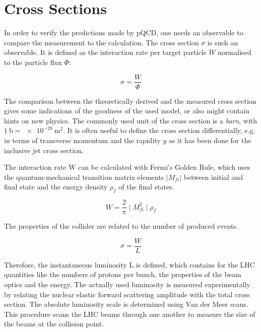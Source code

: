 \section{Cross Sections}

In order to verify the predictions made by pQCD, one needs an observable to compare the measurement to the calculation. The cross section $\sigma$ is such an observable. It is defined as the interaction rate per target particle $W$ normalised to the particle flux $\Phi$:

\begin{equation}
\sigma = \frac{W}{\Phi}
\end{equation}

The comparison between the theoretically derived and the measured cross section gives some indications of the goodness of the used model, or also might contain hints on new physics. The commonly used unit of the cross section is a \emph{barn}, with $\SI{1}{\barn} = \SI{e-28}{\metre \squared}$. It is often useful to define the cross section differentially, e.g. in terms of transverse momentum \pt and the rapidity $y$ as it has been done for the inclusive jet cross section.
\vspace{\baselineskip}

The interaction rate W can be calculated with Fermi's Golden Rule, which uses the quantum-mechanical transition matrix elements $|M_{fi}|$ between initial and final state and the energy density $\rho_f$ of the final states.


\begin{equation}
W = \frac{2}{\pi} \mid M_{fi}^2 \mid \rho_f
\end{equation}

The properties of the collider are related to the number of produced events. 

\begin{equation}
\sigma = \frac{W}{L}
\end{equation}

Therefore, the instantaneous luminosity L is defined, which contains for the LHC quantities like the numbers of protons per bunch, the properties of the beam optics and the energy. 
The actually used luminosity is measured experimentally by relating the nuclear elastic forward scattering amplitude with the total cross section. The absolute luminosity scale is determined using Van der Meer scans. This procedure scans the LHC beams through one another to measure the size of the beams at the collision point.


